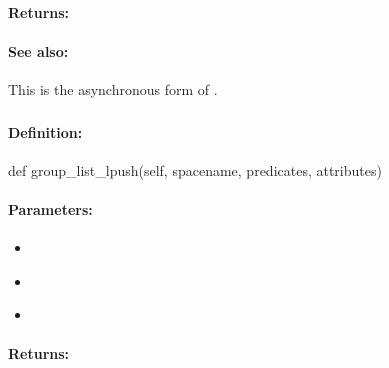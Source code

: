 \paragraph{Returns:}


\paragraph{See also:}  This is the asynchronous form of .

\pagebreak
\subsubsection{}
\label{api:python:group_list_lpush}


\paragraph{Definition:}
\begin{pythoncode}
def group_list_lpush(self, spacename, predicates, attributes)
\end{pythoncode}

\paragraph{Parameters:}
\begin{itemize}[noitemsep]
\item {}\\

\item {}\\

\item {}\\

\end{itemize}

\paragraph{Returns:}


\pagebreak
\subsubsection{}
\label{api:python:async_group_list_lpush}


